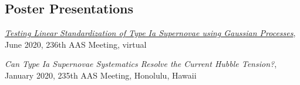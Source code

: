 \documentclass[margin]{res}
\begin{document}
\begin{resume}






\section{Poster Presentations}
\hangindent=15pt 
\href{https://aas236-aas.ipostersessions.com/default.aspx?s=02-A5-6C-28-27-98-74-49-ED-38-21-BF-C2-85-DA-39}{\sl Testing Linear Standardization of Type Ia Supernovae using Gaussian Processes}, June 2020, 236th AAS Meeting, virtual
\vspace{-12pt}

\hangindent=15pt 
{\sl Can Type Ia Supernovae Systematics Resolve the Current Hubble Tension?}, January 2020, 235th AAS Meeting, Honolulu, Hawaii
\vspace{-12pt}


\end{resume}
\end{document}
